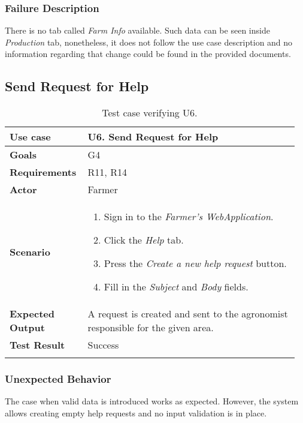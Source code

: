 \subsubsection*{Failure Description}

There is no tab called \textit{Farm Info} available. Such data can be seen inside \textit{Production} tab, nonetheless, it does not follow the use case description and no information regarding that change could be found in the provided documents.

\subsection{Send Request for Help}

\begin{longtable}{@{}p{0.25\linewidth}p{0.71\linewidth}@{}}
	\toprule
	\textbf{Use case} & \textbf{U6.} Send Request for Help\\
	\midrule
	\textbf{Goals} & G4\\
	\midrule
	\textbf{Requirements} & R11, R14\\
	\midrule
	\textbf{Actor} & Farmer\\
	\midrule
	\textbf{Scenario} &
	\begin{enumerate}[leftmargin=.4cm,noitemsep,topsep=0pt,before=\vspace{-3mm},after=\vspace{-4mm}]
		\item Sign in to the \textit{Farmer's WebApplication}.
		\item Click the \textit{Help} tab.
		\item Press the \textit{Create a new help request} button.
		\item Fill in the \textit{Subject} and \textit{Body} fields.
	\end{enumerate}\\
	\midrule
	\textbf{Expected Output} & A request is created and sent to the agronomist responsible for the given area.\\
	\midrule
	\textbf{Test Result} & Success\\
	\bottomrule
    \caption{Test case verifying U6.}
\end{longtable}


\subsubsection*{Unexpected Behavior}

The case when valid data is introduced works as expected. However, the system allows creating empty help requests and no input validation is in place.


